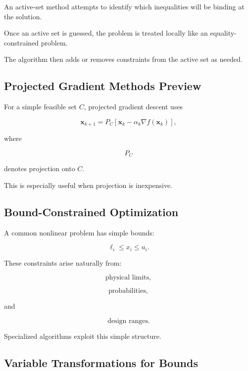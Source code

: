 An active-set method attempts to identify which inequalities will be
binding at the solution.

Once an active set is guessed, the problem is treated locally like an
equality-constrained problem.

The algorithm then adds or removes constraints from the active set as
needed.

\subsection{Projected Gradient Methods Preview}
\label{subsec:projected-gradient-preview}

For a simple feasible set \(C\), projected gradient descent uses

\[
\boxed{
\mathbf{x}_{k+1}
=
P_C
\left[
\mathbf{x}_k
-
\alpha_k
\nabla f(\mathbf{x}_k)
\right],
}
\]

where

\[
P_C
\]

denotes projection onto \(C\).

This is especially useful when projection is inexpensive.

\subsection{Bound-Constrained Optimization}
\label{subsec:bound-constrained-optimization}

A common nonlinear problem has simple bounds:

\[
\boxed{
\ell_i
\leq
x_i
\leq
u_i.
}
\]

These constraints arise naturally from:

\[
\boxed{
\text{physical limits},
}
\]

\[
\boxed{
\text{probabilities},
}
\]

and

\[
\boxed{
\text{design ranges}.
}
\]

Specialized algorithms exploit this simple structure.

\subsection{Variable Transformations for Bounds}
\label{subsec:nlp-variable-transformations}

